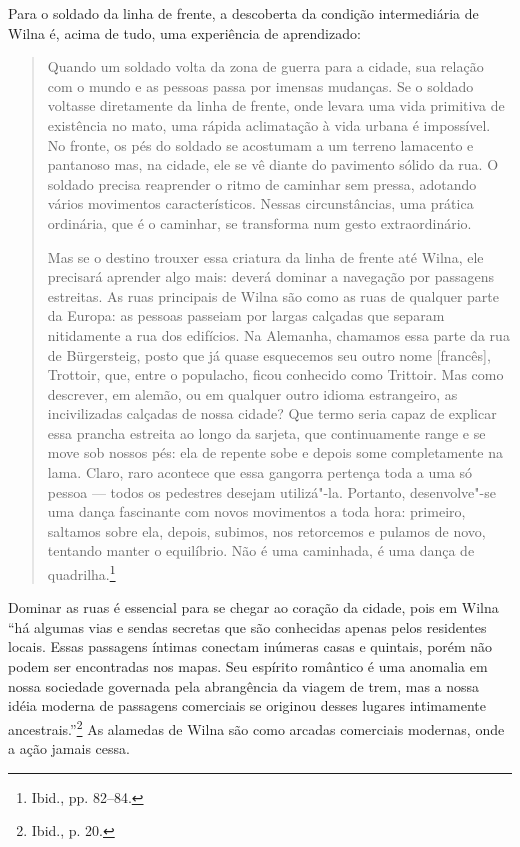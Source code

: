 %

Para o soldado da linha de frente, a descoberta da condição
intermediária de Wilna é, acima de tudo, uma experiência de aprendizado:

\begin{quote}
Quando um soldado volta da zona de guerra para a cidade, sua relação com
o mundo e as pessoas passa por imensas mudanças. Se o soldado voltasse
diretamente da linha de frente, onde levara uma vida primitiva de
existência no mato, uma rápida aclimatação à vida urbana é impossível.
No fronte, os pés do soldado se acostumam a um terreno lamacento e
pantanoso mas, na cidade, ele se vê diante do pavimento sólido da rua. O
soldado precisa reaprender o ritmo de caminhar sem pressa, adotando
vários movimentos característicos. Nessas circunstâncias, uma prática
ordinária, que é o caminhar, se transforma num gesto extraordinário.

Mas se o destino trouxer essa criatura da linha de frente até Wilna, ele
precisará aprender algo mais: deverá dominar a navegação por passagens
estreitas. As ruas principais de Wilna são como as ruas de qualquer
parte da Europa: as pessoas passeiam por largas calçadas que separam
nitidamente a rua dos edifícios. Na Alemanha, chamamos essa parte da rua
de Bürgersteig, posto que já quase esquecemos seu outro nome
{[}francês{]}, Trottoir, que, entre o populacho, ficou conhecido como
Trittoir. Mas como descrever, em alemão, ou em qualquer outro idioma
estrangeiro, as incivilizadas calçadas de nossa cidade? Que termo seria
capaz de explicar essa prancha estreita ao longo da sarjeta, que
continuamente range e se move sob nossos pés: ela de repente sobe e
depois some completamente na lama. Claro, raro acontece que essa
gangorra pertença toda a uma só pessoa --- todos os pedestres desejam
utilizá"-la. Portanto, desenvolve"-se uma dança fascinante com novos
movimentos a toda hora: primeiro, saltamos sobre ela, depois, subimos,
nos retorcemos e pulamos de novo, tentando manter o equilíbrio. Não é
uma caminhada, é uma dança de quadrilha.\footnote{Ibid., pp. 82--84.}
\end{quote}


Dominar as ruas é essencial para se chegar ao coração da cidade, pois em
Wilna ``há algumas vias e sendas secretas que são conhecidas apenas
pelos residentes locais. Essas passagens íntimas conectam inúmeras casas
e quintais, porém não podem ser encontradas nos mapas. Seu espírito
romântico é uma anomalia em nossa sociedade governada pela abrangência
da viagem de trem, mas a nossa idéia moderna de passagens comerciais se
originou desses lugares intimamente ancestrais.''\footnote{Ibid., p. 20.}
As alamedas de Wilna são como arcadas comerciais modernas, onde a ação
jamais cessa.

